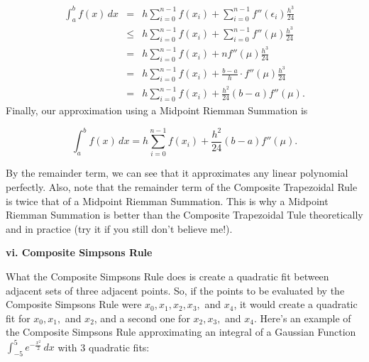 \documentclass[12pt]{article}
\newcommand{\newLine}{\vspace{5mm}}
\newcommand{\nextsubsection}[1]{\newLine \noindent \large \textbf{#1} \normalsize}
\newcommand{\integral}[3]{\text{$\int^{#2}_{#1} #3\,dx$}}
\newcommand{\summation}[3]{\text{$\sum^{#2}_{#1} #3$}}
\begin{document}
\begin{eqnarray*} \integral{a}{b}{f(x)} &=& h\summation{i=0}{n-1}{f(x_i)} + \summation{i=0}{n-1}{f''(\epsilon_i)\frac{h^3}{24}} \\
&\leq& h\summation{i=0}{n-1}{f(x_i)} + \summation{i=0}{n-1}{f''(\mu)\frac{h^3}{24}} \\
&=& h\summation{i=0}{n-1}{f(x_i)} + nf''(\mu)\frac{h^3}{24} \\
&=& h\summation{i=0}{n-1}{f(x_i)} + \frac{b-a}{h}\cdot f''(\mu)\frac{h^3}{24} \\
&=& h\summation{i=0}{n-1}{f(x_i)} +  \frac{h^2}{24}(b-a)f''(\mu).
\end{eqnarray*}
Finally, our approximation using a Midpoint Riemman Summation is 

\begin{equation*} \integral{a}{b}{f(x)} = h\summation{i=0}{n-1}{f(x_i)} + \frac{h^2}{24}(b-a)f''(\mu). \end{equation*}

By the remainder term, we can see that it approximates any linear polynomial perfectly. Also, note that the remainder term of the Composite Trapezoidal Rule is twice that of a Midpoint Riemman Summation. This is why a Midpoint Riemman Summation is better than the Composite Trapezoidal Tule theoretically and in practice (try it if you still don't believe me!).

\nextsubsection{vi. Composite Simpsons Rule}

\newLine What the Composite Simpsons Rule does is create a quadratic fit between adjacent sets of three adjacent points. So, if the points to be evaluated by the Composite Simpsons Rule were $x_0,x_1,x_2,x_3,$ and $x_4$, it would create a quadratic fit for $x_0, x_1,$ and $x_2$, and a second one for $x_2,x_3,$ and $x_4$. Here's an example of the Composite Simpsons Rule approximating an integral of a Gaussian Function $\integral{-5}{5}{e^{-\frac{x^2}{2}}}$ with 3 quadratic fits:
\end{document}
